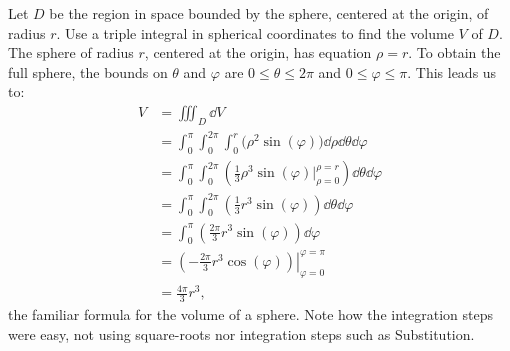 \begin{example}\label{ex_spherical2}
Let $D$ be the region in space bounded by the sphere, centered at the origin, of radius $r$. Use a triple integral in spherical coordinates to find the volume $V$ of $D$.
\solution
The sphere of radius $r$, centered at the origin, has equation $\rho = r$. To obtain the full sphere, the bounds on $\theta$ and $\varphi$ are $0\leq \theta \leq 2\pi$ and $0 \leq \varphi \leq \pi$. This leads us to:
\begin{align*}
V &= \iiint_D\dd V\\
	&= \int_0^{\pi}\int_0^{2\pi}\int_0^r\bigl(\rho^2\sin(\varphi)\bigr)\dd\rho\dd\theta\dd\varphi\\
	&= \int_0^\pi\int_0^{2\pi}\left(\frac13\rho^3\sin(\varphi)\Bigr|_{\rho=0}^{\rho=r}\right)\dd\theta\dd\varphi\\
	&= \int_0^\pi\int_0^{2\pi} \left(\frac13r^3\sin(\varphi)\right)\dd\theta\dd\varphi\\
	&= \int_0^\pi \left(\frac{2\pi}3r^3\sin(\varphi)\right)\dd\varphi\\
	&= \left.\left(-\frac{2\pi}3r^3\cos(\varphi)\right)\right|_{\varphi=0}^{\varphi=\pi}\\
	&= \frac{4\pi}3r^3,
\end{align*}
the familiar formula for the volume of a sphere. Note how the integration steps were easy, not using square-roots nor integration steps such as Substitution.
\end{example}


